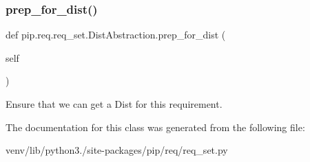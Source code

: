 \subsubsection{\texorpdfstring{prep\+\_\+for\+\_\+dist()}{prep\_for\_dist()}}
{\footnotesize\ttfamily def pip.\+req.\+req\+\_\+set.\+Dist\+Abstraction.\+prep\+\_\+for\+\_\+dist (\begin{DoxyParamCaption}\item[{}]{self }\end{DoxyParamCaption})}

\begin{DoxyVerb}Ensure that we can get a Dist for this requirement.\end{DoxyVerb}
 

The documentation for this class was generated from the following file\+:\begin{DoxyCompactItemize}
\item 
venv/lib/python3./site-\/packages/pip/req/req\+\_\+set.\+py\end{DoxyCompactItemize}
